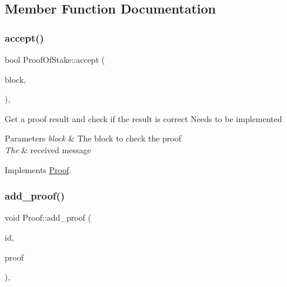 \subsection{Member Function Documentation}
\mbox{\label{classProofOfStake_a7c5939106f9dcb8bc9612a5974a43c88}} 
\subsubsection{\texorpdfstring{accept()}{accept()}}
{\footnotesize\ttfamily bool Proof\+Of\+Stake\+::accept (\begin{DoxyParamCaption}\item[{\mbox{\hyperlink{classBlock}{Block}} $\ast$}]{block,  }\item[{\mbox{\hyperlink{classMessage}{Message}} $\ast$}]{ }\end{DoxyParamCaption})\hspace{0.3cm}{\ttfamily [override]}, {\ttfamily [virtual]}}

Get a proof result and check if the result is correct Needs to be implemented


\begin{DoxyParams}{Parameters}
{\em block} & The block to check the proof \\
\hline
{\em The} & received message \\
\hline
\end{DoxyParams}


Implements \mbox{\hyperlink{classProof_ad52fee058ea617a186133cb6a008fe6e}{Proof}}.

\mbox{\label{classProof_a71874539fdbcc93c15594b889c95225b}} 
\subsubsection{\texorpdfstring{add\+\_\+proof()}{add\_proof()}}
{\footnotesize\ttfamily void Proof\+::add\+\_\+proof (\begin{DoxyParamCaption}\item[{int}]{id,  }\item[{std\+::function$<$ \mbox{\hyperlink{classProof}{Proof}} $\ast$()$>$}]{proof }\end{DoxyParamCaption})\hspace{0.3cm}{\ttfamily [static]}, {\ttfamily [inherited]}}

